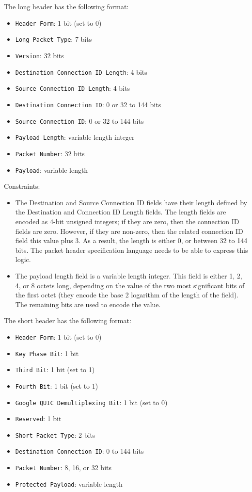 \documentclass[10pt]{article}
\begin{document}
The long header has the following format:
\begin{itemize}
\item \texttt{Header Form}: 1 bit (set to 0)
\item \texttt{Long Packet Type}: 7 bits
\item \texttt{Version}: 32 bits
\item \texttt{Destination Connection ID Length}: 4 bits
\item \texttt{Source Connection ID Length}: 4 bits
\item \texttt{Destination Connection ID}: 0 or 32 to 144 bits
\item \texttt{Source Connection ID}: 0 or 32 to 144 bits
\item \texttt{Payload Length}: variable length integer
\item \texttt{Packet Number}: 32 bits
\item \texttt{Payload}: variable length
\end{itemize}

Constraints:
\begin{itemize}
\item The Destination and Source Connection ID fields have their length defined by the
Destination and Connection ID Length fields. The length fields are encoded as 4-bit
unsigned integers; if they are zero, then the connection ID fields are zero. However, if
they are non-zero, then the related connection ID field this value plus 3. As a result,
the length is either 0, or between 32 to 144 bits. The packet header specification
language needs to be able to express this logic.
\item The payload length field is a variable length integer. This field is either 1, 2,
4, or 8 octets long, depending on the value of the two most significant bits of the first
octet (they encode the base 2 logarithm of the length of the field). The remaining bits
are used to encode the value.
\end{itemize}

The short header has the following format:
\begin{itemize}
\item \texttt{Header Form}: 1 bit (set to 0)
\item \texttt{Key Phase Bit}: 1 bit
\item \texttt{Third Bit}: 1 bit (set to 1)
\item \texttt{Fourth Bit}: 1 bit (set to 1)
\item \texttt{Google QUIC Demultiplexing Bit}: 1 bit (set to 0)
\item \texttt{Reserved}: 1 bit
\item \texttt{Short Packet Type}: 2 bits
\item \texttt{Destination Connection ID}: 0 to 144 bits
\item \texttt{Packet Number}: 8, 16, or 32 bits
\item \texttt{Protected Payload}: variable length
\end{itemize}
\end{document}
